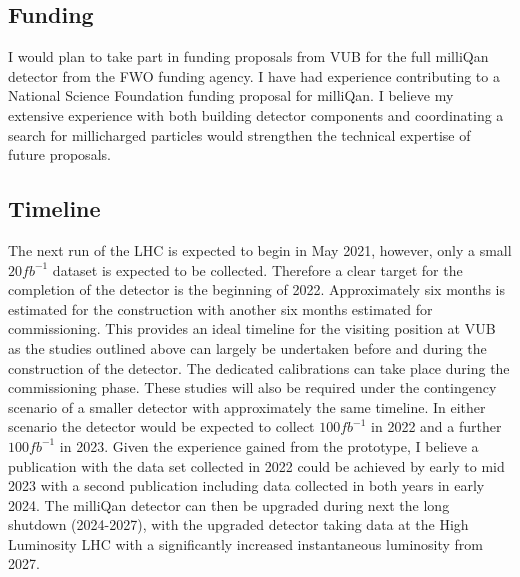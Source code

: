 \documentclass[11pt]{article}
\theoremstyle{plain} \numberwithin{equation}{section}
\theoremstyle{definition}
\begin{document}
\subsection*{Funding}

I would plan to take part in funding proposals from VUB for the full milliQan detector
from the FWO funding agency. I have had experience contributing to a National Science
Foundation funding proposal for milliQan. I believe my extensive 
experience with both building detector components and coordinating 
a search for millicharged particles would strengthen the technical
expertise of future proposals.

\subsection*{Timeline}

The next run of the LHC is expected to begin in May 2021, however, only a small $20fb^{-1}$ dataset is 
expected to be collected. Therefore a clear target for the completion of the detector
is the beginning of 2022. Approximately six months is estimated for the construction with another six months
estimated for commissioning. This provides an ideal timeline for the visiting position at VUB as 
the studies outlined above can largely be undertaken before and during the construction of the detector.
The dedicated calibrations can take place during the commissioning phase. These studies will also be
required under the contingency scenario of a smaller detector with approximately the same timeline.
In either scenario the detector would be expected to collect $100fb^{-1}$ in 2022 and a further $100fb^{-1}$ in 2023.
Given the experience gained from the prototype, I believe a publication with the data set collected 
in 2022 could be achieved by early to mid 2023 with a second publication including data collected in both years in
early 2024. The milliQan detector can then be upgraded during next the long shutdown (2024-2027), with the upgraded
detector taking data at the High Luminosity LHC with a significantly increased instantaneous luminosity from 2027. 
\end{document}
